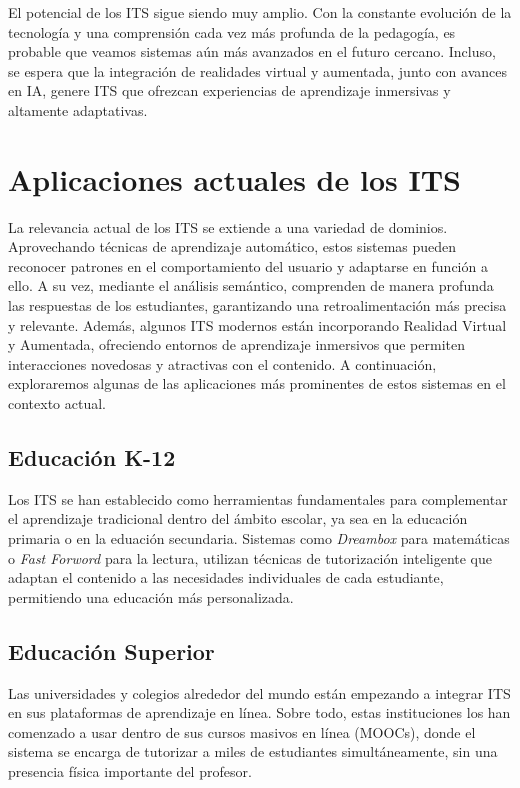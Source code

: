 El potencial de los ITS sigue siendo muy amplio. Con la constante evolución de la tecnología y una comprensión cada vez más profunda de la pedagogía, es probable que veamos sistemas aún más avanzados en el futuro cercano. Incluso, se espera que la integración de realidades virtual y aumentada, junto con avances en IA, genere ITS que ofrezcan experiencias de aprendizaje inmersivas y altamente adaptativas. 

\section{Aplicaciones actuales de los ITS}

La relevancia actual de los ITS se extiende a una variedad de dominios. Aprovechando técnicas de aprendizaje automático, estos sistemas pueden reconocer patrones en el comportamiento del usuario y adaptarse en función a ello. A su vez, mediante el análisis semántico, comprenden de manera profunda las respuestas de los estudiantes, garantizando una retroalimentación más precisa y relevante. Además, algunos ITS modernos están incorporando Realidad Virtual y Aumentada, ofreciendo entornos de aprendizaje inmersivos que permiten interacciones novedosas y atractivas con el contenido. A continuación, exploraremos algunas de las aplicaciones más prominentes de estos sistemas en el contexto actual.

\subsection{Educación K-12}

Los ITS se han establecido como herramientas fundamentales para complementar el aprendizaje tradicional dentro del ámbito escolar, ya sea en la educación primaria o en la eduación secundaria. Sistemas como \textit{Dreambox} \cite{dreambox} para matemáticas o \textit{Fast Forword} \cite{fastforword} para la lectura, utilizan técnicas de tutorización inteligente que adaptan el contenido a las necesidades individuales de cada estudiante, permitiendo una educación más personalizada.

\subsection{Educación Superior}

Las universidades y colegios alrededor del mundo están empezando a integrar ITS en sus plataformas de aprendizaje en línea. Sobre todo, estas instituciones los han comenzado a usar dentro de sus cursos masivos en línea (MOOCs), donde el sistema se encarga de tutorizar a miles de estudiantes simultáneamente, sin una presencia física importante del profesor.

